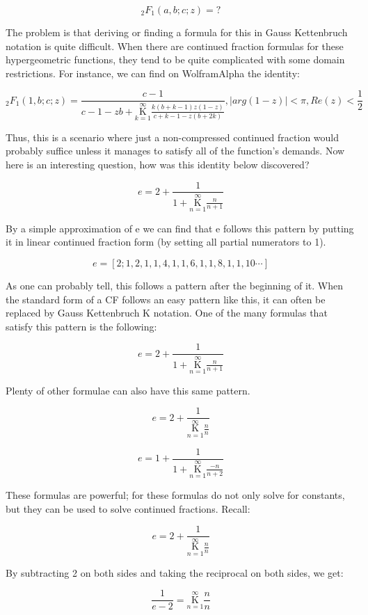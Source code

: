 \documentclass{article}
\begin{document}
$$ {}_2F_1(a, b; c; z) = ?$$

The problem is that deriving or finding a formula for this in Gauss Kettenbruch notation is quite difficult. When there are continued fraction formulas for these hypergeometric functions, they tend to be quite complicated with some domain restrictions. For instance, we can find on WolframAlpha the identity:

$$_2 F_1 (1,b;c;z) = \frac{c-1}{c-1-zb+ \underset{k=1}{\overset{\infty}{\mathrm K}} \frac{k(b+k-1)z(1-z)}{c+k-1-z(b+2k)}},|arg(1-z)|<\pi,Re(z)<\frac{1}{2}$$

Thus, this is a scenario where just a non-compressed continued fraction would probably suffice unless it manages to satisfy all of the function’s demands. Now here is an interesting question, how was this identity below discovered?

$$ e = 2 +  \frac{1}{1+\underset{n=1}{\overset{\infty}{ \mathrm K}} \frac{n}{n+1}} $$

By a simple approximation of e we can find that e follows this pattern by putting it in linear continued fraction form (by setting all partial numerators to 1).

$$ e = [2;1,2,1,1,4,1,1,6,1,1,8,1,1,10 \cdots] $$

As one can probably tell, this follows a pattern after the beginning of it. When the standard form of a CF follows an easy pattern like this, it can often be replaced by Gauss Kettenbruch K notation. One of the many formulas that satisfy this pattern is the following:

$$ e = 2 +  \frac{1}{1+\underset{n=1}{\overset{\infty}{ \mathrm K}} \frac{n}{n+1}} $$

Plenty of other formulae can also have this same pattern.

$$ e = 2 +  \frac{1}{\underset{n=1}{\overset{\infty}{ \mathrm K}} \frac{n}{n}} $$

$$ e = 1 +  \frac{1}{1+\underset{n=1}{\overset{\infty}{ \mathrm K}} \frac{-n}{n+2}} $$

These formulas are powerful; for these formulas do not only solve for constants, but they can be used to solve continued fractions. Recall:

$$ e = 2 +  \frac{1}{\underset{n=1}{\overset{\infty}{ \mathrm K}} \frac{n}{n}} $$

By subtracting 2 on both sides and taking the reciprocal on both sides, we get:

$$ \frac{1}{e-2} = \underset{n=1}{\overset{\infty}{ \mathrm K}} \frac{n}{n} $$
\end{document}
